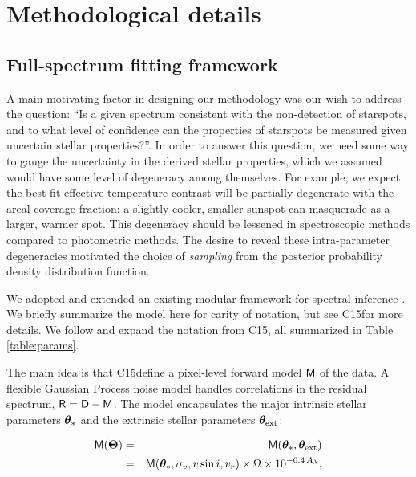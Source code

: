 \documentclass[twocolumn]{emulateapj}%
\newcommand{\iancze}{{\sc C15}}
\begin{document}
\section{Methodological details}
\label{methods-details}

\subsection{Full-spectrum fitting framework}


A main motivating factor in designing our methodology was our wish to address the question: ``Is a given spectrum consistent with the non-detection of starspots, and to what level of confidence can the properties of starspots be measured given uncertain stellar properties?''.  In order to answer this question, we need some way to gauge the uncertainty in the derived stellar properties, which we assumed would have some level of degeneracy among themselves.  For example, we expect the best fit effective temperature contrast will be partially degenerate with the areal coverage fraction: a slightly cooler, smaller sunspot can masquerade as a larger, warmer spot.  This degeneracy should be lessened in spectroscopic methods compared to photometric methods.  The desire to reveal these intra-parameter degeneracies motivated the choice of \emph{sampling} from the posterior probability density distribution function.


We adopted and extended an existing modular framework for spectral inference \citep[][hereafter \iancze]{czekala15}.  We briefly summarize the model here for carity of notation, but see \iancze for more details.  We follow and expand the notation from \iancze, all summarized in Table \ref{table:params}. 

The main idea is that \iancze define a pixel-level forward model $\mathsf{M}$ of the data.  A flexible Gaussian Process noise model handles correlations in the residual spectrum, $\mathsf{R}= \mathsf{D} - \mathsf{M}$.  The model encapsulates the major intrinsic stellar parameters ${\bm \theta}_{\ast}$ and the extrinsic stellar parameters ${\bm \theta}_{\rm ext}$:

\begin{eqnarray} \label{eqn:scaling}
\mathsf{M}({\bm \Theta}) &=& \mathsf{M}({\bm \theta}_{\ast}, {\bm \theta}_{\rm ext}) \\
         &=& \mathsf{M}({\bm \theta}_{\ast}, \sigma_v, v\sin{i}, v_r) \times \Omega \times 10^{-0.4\,A_{\lambda}}, \nonumber
\end{eqnarray}
\end{document}
